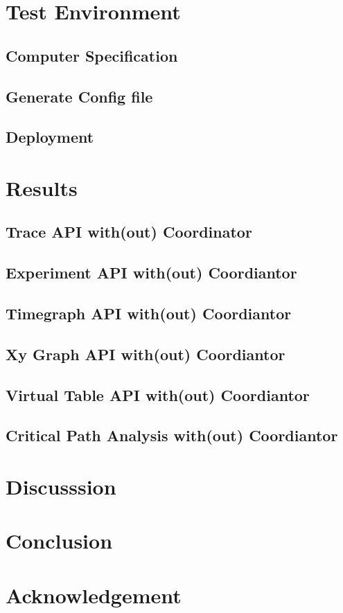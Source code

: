 \section{Test Environment}

\subsection{Computer Specification}

\subsection{Generate Config file}

\subsection{Deployment}

\section{Results}

\subsection{Trace API with(out) Coordinator}

\subsection{Experiment API with(out) Coordiantor}

\subsection{Timegraph API with(out) Coordiantor}

\subsection{Xy Graph API with(out) Coordiantor}

\subsection{Virtual Table API with(out) Coordiantor}

\subsection{Critical Path Analysis with(out) Coordiantor}

\section{Discusssion}

\section{Conclusion}

\section{Acknowledgement}